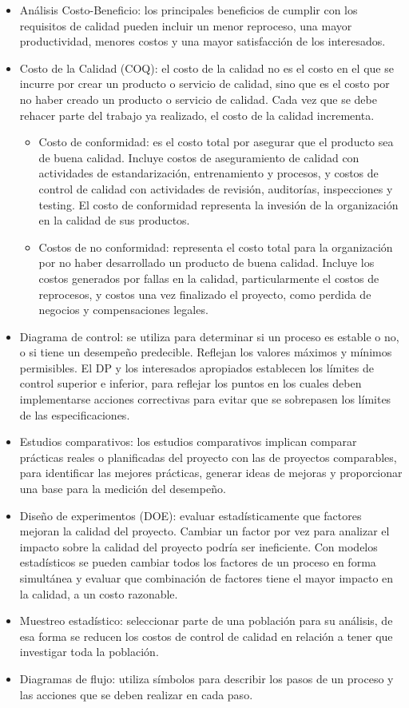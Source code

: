 \documentclass[a4paper,twosides]{article}
\newlength{\wideitemsep}
\let\olditem\item
\renewcommand{\item}{\setlength{\itemsep}{\wideitemsep}\olditem}
\begin{document}
\begin{itemize}
\item Análisis Costo-Beneficio: los principales beneficios de cumplir con los requisitos de calidad pueden incluir un menor reproceso, una mayor productividad, menores costos y una mayor satisfacción de los interesados.
\item Costo de la Calidad (COQ): el costo de la calidad no es el costo en el que se incurre por crear un producto o servicio de calidad, sino que es el costo por no haber creado un producto o servicio de calidad. Cada vez que se debe rehacer parte del trabajo ya realizado, el costo de la calidad incrementa.
\begin{itemize}
\item Costo de conformidad: es el costo total por asegurar que el producto sea de buena calidad. Incluye costos de aseguramiento de calidad con actividades de estandarización, entrenamiento y procesos, y costos de control de calidad con actividades de revisión, auditorías, inspecciones y testing. El costo de conformidad representa la invesión de la organización en la calidad de sus productos.
\item Costos de no conformidad: representa el costo total para la organización por no haber desarrollado un producto de buena calidad. Incluye los costos generados por fallas en la calidad, particularmente el costos de reprocesos, y costos una vez finalizado el proyecto, como perdida de negocios y compensaciones legales.
\end{itemize}
\item Diagrama de control: se utiliza para determinar si un proceso es estable o no, o si tiene un desempeño predecible. Reflejan los valores máximos y mínimos permisibles. El DP y los interesados apropiados establecen los límites de control superior e inferior, para reflejar los puntos en los cuales deben implementarse acciones correctivas para evitar que se sobrepasen los límites de las especificaciones.
\item Estudios comparativos: los estudios comparativos implican comparar prácticas reales o planificadas del proyecto con las de proyectos comparables, para identificar las mejores prácticas, generar ideas de mejoras y proporcionar una base para la medición del desempeño.
\item Diseño de experimentos (DOE): evaluar estadísticamente que factores mejoran la calidad del proyecto. Cambiar un factor por vez para analizar el impacto sobre la calidad del proyecto podría ser ineficiente. Con modelos estadísticos se pueden cambiar todos los factores de un proceso en forma simultánea y evaluar que combinación de factores tiene el mayor impacto en la calidad, a un costo razonable.
\item Muestreo estadístico: seleccionar parte de una población para su análisis, de esa forma se reducen los costos de control de calidad en relación a tener que investigar toda la población.
\item Diagramas de flujo: utiliza símbolos para describir los pasos de un proceso y las acciones que se deben realizar en cada paso.
\end{itemize}
\end{document}
